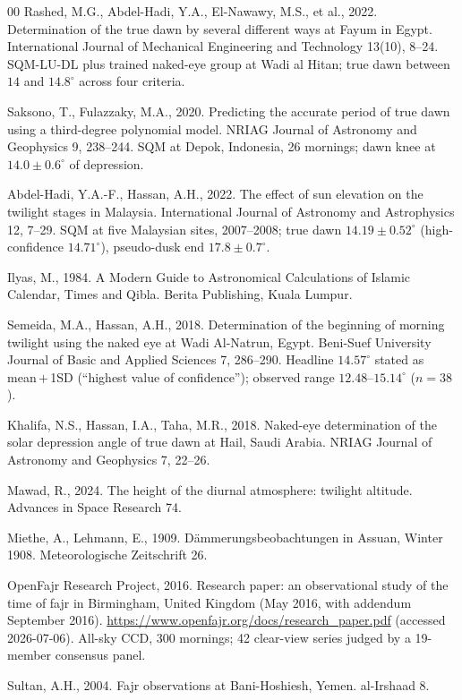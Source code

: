 \documentclass[preprint,12pt]{elsarticle}
\begin{document}
\begin{thebibliography}{00}
Rashed, M.G., Abdel-Hadi, Y.A., El-Nawawy, M.S., et al., 2022.
Determination of the true dawn by several different ways at Fayum in
Egypt. International Journal of Mechanical Engineering and Technology
13(10), 8--24. SQM-LU-DL plus trained naked-eye group at Wadi al
Hitan; true dawn between $14$ and $14.8^\circ$ across four criteria.

Saksono, T., Fulazzaky, M.A., 2020. Predicting the accurate period of
true dawn using a third-degree polynomial model. NRIAG Journal of
Astronomy and Geophysics 9, 238--244. SQM at Depok, Indonesia, 26
mornings; dawn knee at $14.0 \pm 0.6^\circ$ of depression.

Abdel-Hadi, Y.A.-F., Hassan, A.H., 2022. The effect of sun elevation
on the twilight stages in Malaysia. International Journal of Astronomy
and Astrophysics 12, 7--29. SQM at five Malaysian sites, 2007--2008;
true dawn $14.19 \pm 0.52^\circ$ (high-confidence $14.71^\circ$),
pseudo-dusk end $17.8 \pm 0.7^\circ$.

Ilyas, M., 1984. A Modern Guide to Astronomical Calculations of Islamic
Calendar, Times and Qibla. Berita Publishing, Kuala Lumpur.

Semeida, M.A., Hassan, A.H., 2018. Determination of the beginning of
morning twilight using the naked eye at Wadi Al-Natrun, Egypt.
Beni-Suef University Journal of Basic and Applied Sciences 7, 286--290.
Headline $14.57^\circ$ stated as mean\,$+$\,1SD (``highest value of
confidence''); observed range $12.48$--$15.14^\circ$ ($n=38$).

Khalifa, N.S., Hassan, I.A., Taha, M.R., 2018. Naked-eye determination
of the solar depression angle of true dawn at Hail, Saudi Arabia. NRIAG
Journal of Astronomy and Geophysics 7, 22--26.

Mawad, R., 2024. The height of the diurnal atmosphere: twilight
altitude. Advances in Space Research 74.

Miethe, A., Lehmann, E., 1909. D\"ammerungsbeobachtungen in Assuan,
Winter 1908. Meteorologische Zeitschrift 26.

OpenFajr Research Project, 2016. Research paper: an observational
study of the time of fajr in Birmingham, United Kingdom (May 2016,
with addendum September 2016).
\url{https://www.openfajr.org/docs/research_paper.pdf} (accessed
2026-07-06). All-sky CCD, 300 mornings; 42 clear-view series judged
by a 19-member consensus panel.

Sultan, A.H., 2004. Fajr observations at Bani-Hoshiesh, Yemen.
al-Irshaad 8.

\end{thebibliography}
\end{document}
